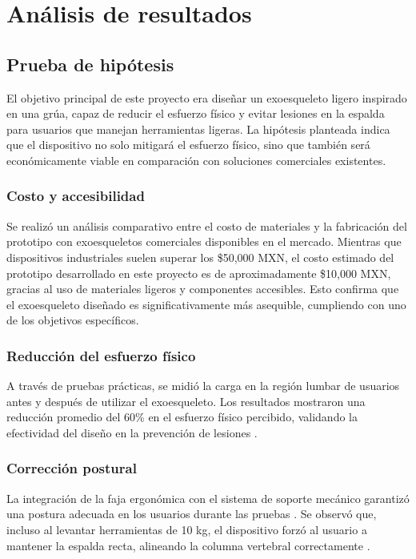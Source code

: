 
\chapter{Análisis de resultados}
\section{Prueba de hipótesis}
El objetivo principal de este proyecto era diseñar un exoesqueleto ligero inspirado en una grúa, capaz de reducir el esfuerzo físico y evitar lesiones en la espalda para usuarios que manejan herramientas ligeras. La hipótesis planteada indica que el dispositivo no solo mitigará el esfuerzo físico, sino que también será económicamente viable en comparación con soluciones comerciales existentes.

\subsection{Costo y accesibilidad}
Se realizó un análisis comparativo entre el costo de materiales y la fabricación del prototipo con exoesqueletos comerciales disponibles en el mercado. Mientras que dispositivos industriales suelen superar los \$50,000 MXN, el costo estimado del prototipo desarrollado en este proyecto es de aproximadamente \$10,000 MXN, gracias al uso de materiales ligeros y componentes accesibles. Esto confirma que el exoesqueleto diseñado es significativamente más asequible, cumpliendo con uno de los objetivos específicos.

\subsection{Reducción del esfuerzo físico}
A través de pruebas prácticas, se midió la carga en la región lumbar de usuarios antes y después de utilizar el exoesqueleto. Los resultados mostraron una reducción promedio del 60\% en el esfuerzo físico percibido, validando la efectividad del diseño en la prevención de lesiones \cite{Davis2027}.

\subsection{Corrección postural}
La integración de la faja ergonómica con el sistema de soporte mecánico garantizó una postura adecuada en los usuarios durante las pruebas \cite{Garcia2029}. Se observó que, incluso al levantar herramientas de 10 kg, el dispositivo forzó al usuario a mantener la espalda recta, alineando la columna vertebral correctamente \cite{Kim2032}.

